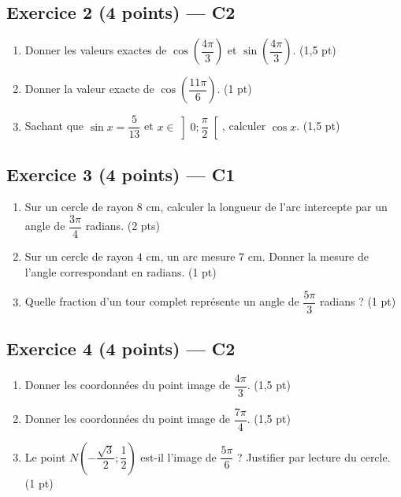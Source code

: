 \subsection*{Exercice 2 \hfill (4 points) — C2}

\begin{enumerate}
  \item Donner les valeurs exactes de $\cos\!\left(\dfrac{4\pi}{3}\right)$ et $\sin\!\left(\dfrac{4\pi}{3}\right)$. \hfill (1,5 pt)
  \item Donner la valeur exacte de $\cos\!\left(\dfrac{11\pi}{6}\right)$. \hfill (1 pt)
  \item Sachant que $\sin x = \dfrac{5}{13}$ et $x \in \left]0;\dfrac{\pi}{2}\right[$, calculer $\cos x$. \hfill (1,5 pt)
\end{enumerate}

\subsection*{Exercice 3 \hfill (4 points) — C1}

\begin{enumerate}
  \item Sur un cercle de rayon $8$ cm, calculer la longueur de l'arc intercepte par un angle de $\dfrac{3\pi}{4}$ radians. \hfill (2 pts)
  \item Sur un cercle de rayon $4$ cm, un arc mesure $7$ cm. Donner la mesure de l'angle correspondant en radians. \hfill (1 pt)
  \item Quelle fraction d'un tour complet représente un angle de $\dfrac{5\pi}{3}$ radians ? \hfill (1 pt)
\end{enumerate}

\subsection*{Exercice 4 \hfill (4 points) — C2}

\begin{enumerate}
  \item Donner les coordonnées du point image de $\dfrac{4\pi}{3}$. \hfill (1,5 pt)
  \item Donner les coordonnées du point image de $\dfrac{7\pi}{4}$. \hfill (1,5 pt)
  \item Le point $N\left(-\dfrac{\sqrt3}{2};\dfrac12\right)$ est-il l'image de $\dfrac{5\pi}{6}$ ? Justifier par lecture du cercle. \hfill (1 pt)
\end{enumerate}


